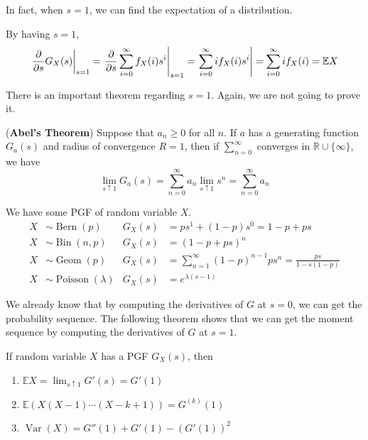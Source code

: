 \documentclass{huhtakm-template-book}
\newcommand{\expect}{\mathbb{E}}
\DeclareMathOperator{\Bern}{Bern}
\DeclareMathOperator{\Bin}{Bin}
\DeclareMathOperator{\Geom}{Geom}
\DeclareMathOperator{\Poisson}{Poisson}
\DeclareMathOperator{\Var}{Var}
\begin{document}
In fact, when $s=1$, we can find the expectation of a distribution.
\begin{eg}
	\label{Expectation from PGF}
	By having $s=1$,
	\begin{equation*}
		\left.\pdv*{G_{X}(s)}{s}\right|_{s=1}=\left.\pdv*{\sum_{i=0}^{\infty}f_{X}(i)s^{i}}{s}\right|_{s=1}=\left.\sum_{i=0}^{\infty}if_{X}(i)s^{i}\right|=\sum_{i=0}^{\infty}if_{X}(i)=\expect X
	\end{equation*}
\end{eg}
There is an important theorem regarding $s=1$. Again, we are not going to prove it.
\begin{thm}(\textbf{Abel's Theorem})
	Suppose that $a_{n}\geq 0$ for all $n$. If $a$ has a generating function $G_{a}(s)$ and radius of convergence $R=1$, then if $\sum_{n=0}^{\infty}$ converges in $\mathbb{R}\cup\{\infty\}$, we have
	\begin{equation*}
		\lim_{s\uparrow 1}G_{a}(s)=\sum_{n=0}^{\infty}a_{n}\lim_{s\uparrow 1}s^{n}=\sum_{n=0}^{\infty}a_{n}
	\end{equation*}
\end{thm}
\begin{eg}
	We have some PGF of random variable $X$.
	\begin{align*}
		X&\sim\Bern(p) & G_{X}(s)&=ps^{1}+(1-p)s^{0}=1-p+ps\\
		X&\sim\Bin(n,p) & G_{X}(s)&=(1-p+ps)^{n}\\
		X&\sim\Geom(p) & G_{X}(s)&=\sum_{n=1}^{\infty}(1-p)^{n-1}ps^{n}=\frac{ps}{1-s(1-p)}\\
		X&\sim\Poisson(\lambda) & G_{X}(s)&=e^{\lambda(s-1)}
	\end{align*}
\end{eg}
We already know that by computing the derivatives of $G$ at $s=0$, we can get the probability sequence. The following theorem shows that we can get the moment sequence by computing the derivatives of $G$ at $s=1$.
\begin{thm}
	If random variable $X$ has a PGF $G_{X}(s)$, then
	\begin{enumerate}
		\item $\expect X=\lim_{s\uparrow 1}G'(s)=G'(1)$
		\item $\expect(X(X-1)\cdots(X-k+1))=G^{(k)}(1)$
		\item $\Var(X)=G''(1)+G'(1)-(G'(1))^{2}$
	\end{enumerate}
\end{thm}
\end{document}
